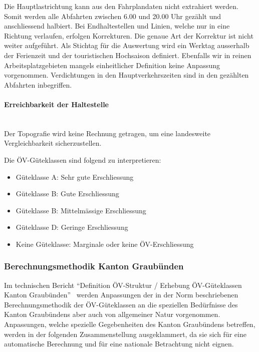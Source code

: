 Die Hauptlastrichtung kann aus den Fahrplandaten nicht extrahiert werden.
Somit werden alle Abfahrten zwischen 6.00 und 20.00 Uhr gezählt und anschliessend halbiert. Bei Endhaltestellen und Linien, welche nur in eine Richtung verlaufen, erfolgen Korrekturen.
Die genaue Art der Korrektur ist nicht weiter aufgeführt.
Als Stichtag für die Auswertung wird ein Werktag ausserhalb der Ferienzeit und der touristischen Hochsaison definiert.
Ebenfalls wir in reinen Arbeitsplatzgebieten mangels einheitlicher Definition keine Anpassung vorgenommen.
Verdichtungen in den Hauptverkehrszeiten sind in den gezählten Abfahrten inbegriffen.

\paragraph{Erreichbarkeit der Haltestelle}~\\
\label{Berechnungsmethodik ARE:Erreichbarkeit der Haltestelle}
Der Topografie wird keine Rechnung getragen, um eine landesweite Vergleichbarkeit sicherzustellen.

Die \acs{ÖV}-Güteklassen sind folgend zu interpretieren:

\begin{itemize}[noitemsep]
    \item Güteklasse A: Sehr gute Erschliessung
    \item Güteklasse B: Gute Erschliessung
    \item Güteklasse B: Mittelmässige Erschliessung
    \item Güteklasse D: Geringe Erschliessung
    \item Keine Güteklasse: Marginale oder keine \acs{ÖV}-Erschliessung
\end{itemize}

\subsubsection{Berechnungsmethodik Kanton Graubünden}
\label{Lösungsansätze:Berechnungsmethodik Kanton Graubünden}
Im technischen Bericht "`Definition \acs{ÖV}-Struktur / Erhebung  \acs{ÖV}-Güteklassen Kanton Graubünden"'~\cite{oev-guteklasse-gr} werden Anpassungen der in der Norm beschriebenen Berechnungsmethodik der \acs{ÖV}-Güteklassen an die speziellen Bedürfnisse des Kanton Graubündens aber auch von allgemeiner Natur vorgenommen.
Anpassungen, welche spezielle Gegebenheiten des Kanton Graubündens betreffen, werden in der folgenden Zusammenstellung ausgeklammert, da sie sich für eine automatische Berechnung und für eine nationale Betrachtung nicht eignen.

